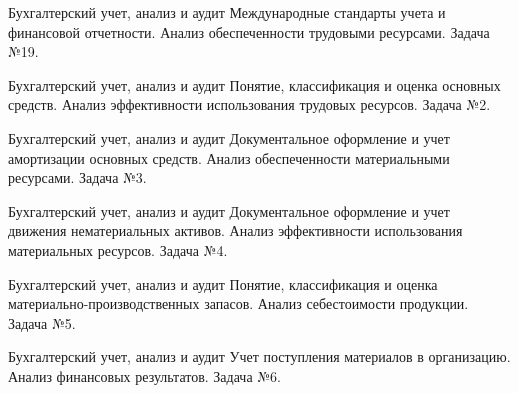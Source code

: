 \documentclass[
	11pt,
	a4paper,
	]
	{article}
\begin{document}
\begin{minipage}[t][\miniH]{\miniL}\centering
	 {Бухгалтерский учет, анализ и аудит}
		{
			Международные стандарты учета и финансовой отчетности.
		}{
			Анализ обеспеченности трудовыми ресурсами.
		}{
			Задача №19.
		}
	\lowGE
\end{minipage}

\vfill



\begin{minipage}[t][\miniH]{\miniL}\centering
	 {Бухгалтерский учет, анализ и аудит}
		{
			Понятие, классификация и оценка основных средств.
		}{
			Анализ эффективности использования трудовых ресурсов.
		}{
			Задача №2.
		}
	\lowGE
\end{minipage}

\vfill



\begin{minipage}[t][\miniH]{\miniL}\centering
	 {Бухгалтерский учет, анализ и аудит}
		{
			Документальное оформление и учет амортизации основных средств.
		}{
			Анализ обеспеченности материальными ресурсами.
		}{
			Задача №3.
		}
	\lowGE
\end{minipage}





\begin{minipage}[t][\miniH]{\miniL}\centering
	 {Бухгалтерский учет, анализ и аудит}
		{
			Документальное оформление и учет движения нематериальных активов.
		}{
			Анализ эффективности использования материальных ресурсов.
		}{
			Задача №4.
		}
	\lowGE
\end{minipage}

\vfill



\begin{minipage}[t][\miniH]{\miniL}\centering
	 {Бухгалтерский учет, анализ и аудит}
		{
			Понятие, классификация и оценка материально-производственных запасов.
		}{
			Анализ себестоимости продукции.
		}{
			Задача №5.
		}
	\lowGE
\end{minipage}

\vfill



\begin{minipage}[t][\miniH]{\miniL}\centering
	 {Бухгалтерский учет, анализ и аудит}
		{
			Учет поступления материалов в организацию.
		}{
			Анализ финансовых результатов.
		}{
			Задача №6.
		}
	\lowGE
\end{minipage}
\end{document}
